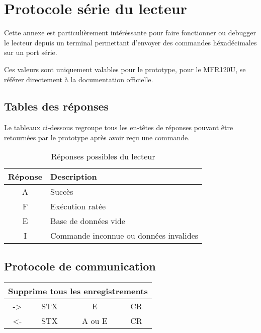 \chapter{Protocole série du lecteur}

    Cette annexe est particulièrement intéréssante pour faire fonctionner ou debugger
le lecteur depuis un terminal permettant d'envoyer des commandes héxadécimales sur
un port série. 

    Ces valeurs sont uniquement valables pour le prototype, pour le MFR120U, se 
référer directement à la documentation officielle.

\section{Tables des réponses}

    Le tableaux ci-dessous regroupe tous les en-têtes de réponses pouvant être
retournées par le prototype après avoir reçu une commande.

\begin{table}[h]
\begin{center}

    \begin{tabular}{|c|M{3cm}|}
    \hline
    Réponse & Description \tabularnewline
    \hline
    A & Succès \tabularnewline
    \hline
    F & Exécution ratée \tabularnewline
    \hline
    E & Base de données vide \tabularnewline
    \hline
    I & Commande inconnue ou données invalides \tabularnewline
    \hline
    \end{tabular}

\end{center}
\caption{Réponses possibles du lecteur}
\label{Réponses possibles du lecteur}
\end{table}





\newpage
\section{Protocole de communication}

\begin{table}[h]
\begin{center}
    \begin{tabular}{|c|c|c|c|c|}
    \hline
    \multicolumn{5}{|c|}{Supprime tous les enregistrements} \\
    \hline
    -> & STX & \multicolumn{2}{c|}{E} & CR \\
    \hline
    <- & STX & \multicolumn{2}{c|}{A ou E} & CR \\
    \hline
    \end{tabular} 
\end{center}
\end{table}

